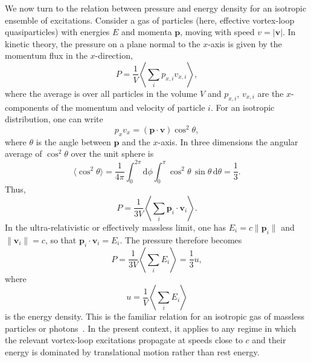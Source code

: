 \documentclass[11pt]{article}
\begin{document}
            We now turn to the relation between pressure and energy density for an isotropic ensemble
            of excitations. Consider a gas of particles (here, effective vortex-loop quasiparticles)
            with energies $E$ and momenta $\boldsymbol{p}$, moving with speed $v = |\boldsymbol{v}|$.
            In kinetic theory, the pressure on a plane normal to the $x$-axis is given by the
            momentum flux in the $x$-direction,
            \begin{equation}
                P
                = \frac{1}{V}
                \left\langle \sum_{i} p_{x,i} v_{x,i} \right\rangle,
            \end{equation}
            where the average is over all particles in the volume $V$ and $p_{x,i}$, $v_{x,i}$ are
            the $x$-components of the momentum and velocity of particle $i$.
            For an isotropic distribution, one can write
            \begin{equation}
                p_{x} v_{x} = (\boldsymbol{p}\cdot\boldsymbol{v})\cos^2\theta,
            \end{equation}
            where $\theta$ is the angle between $\boldsymbol{p}$ and the $x$-axis. In three dimensions
            the angular average of $\cos^2\theta$ over the unit sphere is
            \begin{equation}
                \langle \cos^2\theta \rangle
                = \frac{1}{4\pi}\int_0^{2\pi}\!\mathrm{d}\phi
                \int_0^\pi \cos^2\theta\,\sin\theta\,\mathrm{d}\theta
                = \frac{1}{3}.
            \end{equation}
            Thus,
            \begin{equation}
                P
                = \frac{1}{3V}
                \left\langle \sum_{i} \boldsymbol{p}_i\cdot\boldsymbol{v}_i \right\rangle.
            \end{equation}
            In the ultra-relativistic or effectively massless limit, one has $E_i = c\|\boldsymbol{p}_i\|$
            and $\|\boldsymbol{v}_i\|=c$, so that $\boldsymbol{p}_i\cdot\boldsymbol{v}_i = E_i$.
            The pressure therefore becomes
            \begin{equation}
                P
                = \frac{1}{3V}
                \left\langle \sum_{i} E_i \right\rangle
                = \frac{1}{3} u,
                \label{eq:P-u-1over3}
            \end{equation}
            where
            \begin{equation}
                u
                = \frac{1}{V}\left\langle \sum_{i} E_i \right\rangle
            \end{equation}
        is the energy density. This is the familiar relation for an isotropic gas of massless
        particles or photons~\cite{LandauLifshitz_StatPhys,LandauLifshitz_Fields}. In the
        present context, it applies to any regime in which the relevant vortex-loop excitations
        propagate at speeds close to $c$ and their energy is dominated by translational motion
        rather than rest energy.
\end{document}
